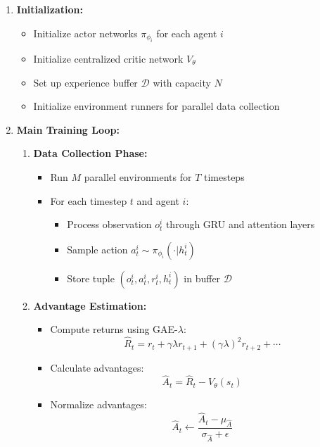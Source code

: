 \begin{enumerate}
\item \textbf{Initialization:}
   \begin{itemize}
   \item Initialize actor networks $\pi_{\phi_i}$ for each agent $i$
   \item Initialize centralized critic network $V_\theta$
   \item Set up experience buffer $\mathcal{D}$ with capacity $N$
   \item Initialize environment runners for parallel data collection
   \end{itemize}

\item \textbf{Main Training Loop:}
   \begin{enumerate}
   \item \textbf{Data Collection Phase:}
      \begin{itemize}
      \item Run $M$ parallel environments for $T$ timesteps
      \item For each timestep $t$ and agent $i$:
         \begin{itemize}
         \item Process observation $o_t^i$ through GRU and attention layers
         \item Sample action $a_t^i \sim \pi_{\phi_i}(\cdot|h_t^i)$
         \item Store tuple $(o_t^i, a_t^i, r_t^i, h_t^i)$ in buffer $\mathcal{D}$
         \end{itemize}
      \end{itemize}

   \item \textbf{Advantage Estimation:}
      \begin{itemize}
      \item Compute returns using GAE-$\lambda$:
      \[
      \hat{R}_t = r_t + \gamma\lambda r_{t+1} + (\gamma\lambda)^2r_{t+2} + \cdots
      \]
      \item Calculate advantages:
      \[
      \hat{A}_t = \hat{R}_t - V_\theta(s_t)
      \]
      \item Normalize advantages:
      \[
      \hat{A}_t \leftarrow \frac{\hat{A}_t - \mu_{\hat{A}}}{\sigma_{\hat{A}} + \epsilon}
      \]
      \end{itemize}


\end{enumerate}
\end{enumerate}

